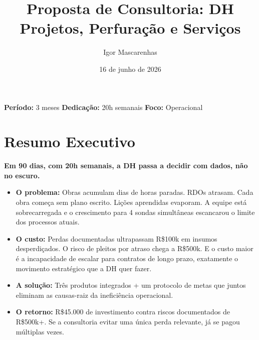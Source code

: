 \documentclass[12pt,a4paper]{scrartcl}
\begin{document}
\title{\textbf{Proposta de Consultoria: DH Projetos, Perfuração e Serviços}}
\author{Igor Mascarenhas}
\date{16 de junho de 2026}
\maketitle

\vspace{-0.5cm}

\begin{center}
\textbf{Período:} 3 meses \hspace{1cm} \textbf{Dedicação:} 20h semanais \hspace{1cm} \textbf{Foco:} Operacional
\end{center}

\section*{Resumo Executivo}

\textbf{Em 90 dias, com 20h semanais, a DH passa a decidir com dados, não no escuro.}

\begin{itemize}
  \item \textbf{O problema:} Obras acumulam dias de horas paradas. RDOs atrasam. Cada obra começa sem plano escrito. Lições aprendidas evaporam. A equipe está sobrecarregada e o crescimento para 4 sondas simultâneas escancarou o limite dos processos atuais.
  \item \textbf{O custo:} Perdas documentadas ultrapassam R\$100k em insumos desperdiçados. O risco de pleitos por atraso chega a R\$500k. E o custo maior é a incapacidade de escalar para contratos de longo prazo, exatamente o movimento estratégico que a DH quer fazer.
  \item \textbf{A solução:} Três produtos integrados + um protocolo de metas que juntos eliminam as causas-raiz da ineficiência operacional.
  \item \textbf{O retorno:} R\$45.000 de investimento contra riscos documentados de R\$500k+. Se a consultoria evitar uma única perda relevante, já se pagou múltiplas vezes.
\end{itemize}

\end{document}
